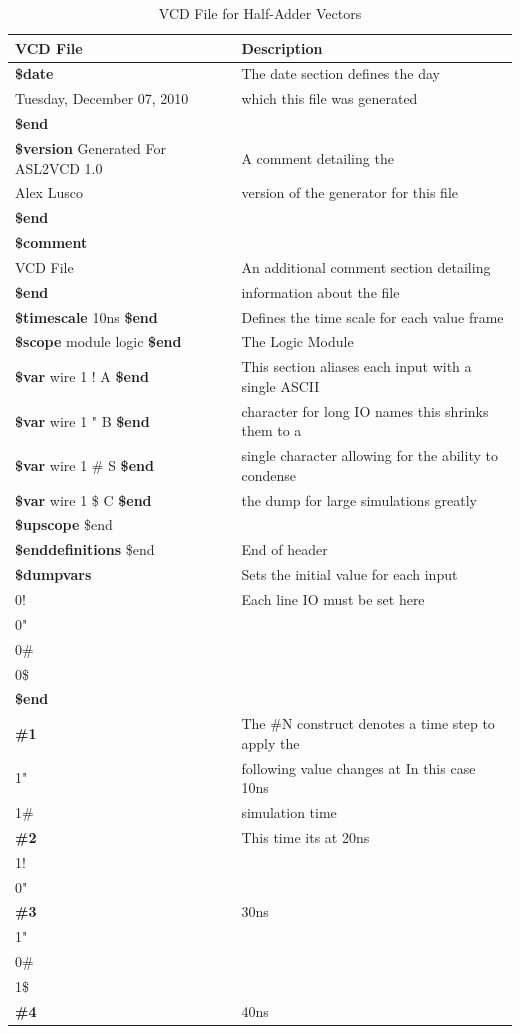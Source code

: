 \documentclass[12pt]{report}
\begin{document}
\begin{table}
	\begin{center}
		\begin{tabular}{l|l}
			VCD File & Description \\ \hline
			\textbf{\$date} & The date section defines the day\\
			Tuesday, December 07, 2010 & which this file was generated \\
			\textbf{\$end} & \\
			\textbf{\$version}
			Generated For ASL2VCD 1.0 & A comment detailing the  \\
			Alex Lusco & version of the generator for this file \\
			\textbf{\$end}	\\
			\textbf{\$comment}	\\
			VCD File & An additional comment section detailing \\
			\textbf{\$end} & information about the file \\
			\textbf{\$timescale} 10ns \textbf{\$end} & Defines the time scale for each value frame \\
			\textbf{\$scope} module logic \textbf{\$end} & The Logic Module \\
			\textbf{\$var} wire 1 ! A \textbf{\$end} & This section aliases each input with a single ASCII \\
			\textbf{\$var} wire 1 " B \textbf{\$end} & character for long IO names this shrinks them to a  \\
			\textbf{\$var} wire 1 \# S \textbf{\$end} & single character allowing for the ability to condense \\
			\textbf{\$var} wire 1 \$ C \textbf{\$end} & the dump for large simulations greatly \\
			\textbf{\$upscope} \$end & \\
			\textbf{\$enddefinitions} \$end & End of header \\
			\textbf{\$dumpvars} & Sets the initial value for each input \\
			0!	& Each line IO must be set here \\
			0"	& \\
			0\# & \\
			0\$ & \\
			\textbf{\$end} & \\
			\textbf{\#1} & The \#N construct denotes a time step to apply the \\
			1" & following value changes at In this case 10ns \\
			1\# & simulation time\\
			\textbf{\#2} & This time its at 20ns \\ 
			1! & \\
			0" & \\
			\textbf{\#3} & 30ns\\
			1" & \\
			0\# & \\
			1\$ & \\	
			\textbf{\#4} & 40ns \\		
		\end{tabular}
	\end{center}
	\caption{VCD File for Half-Adder Vectors}
	\label{tbl:half_adder_vcd}
\end{table} 
\end{document}
